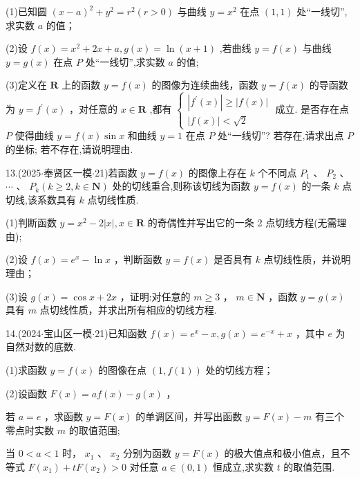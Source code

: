 (1)已知圆 ${\left( x - a\right) }^{2} + {y}^{2} = {r}^{2}\left( {r > 0}\right)$ 与曲线 $y = {x}^{2}$ 在点 $\left( {1,1}\right)$ 处“一线切”,求实数 $a$ 的值；

(2)设 $f\left( x\right)  = {x}^{2} + {2x} + a,g\left( x\right)  = \ln \left( {x + 1}\right)$ ,若曲线 $y = f\left( x\right)$ 与曲线 $y = g\left( x\right)$ 在点 $P$ 处“一线切”,求实数 $a$ 的值;

(3)定义在 $\mathbf{R}$ 上的函数 $y = f\left( x\right)$ 的图像为连续曲线，函数 $y = f\left( x\right)$ 的导函数为 $y = {f}^{\prime }\left( x\right)$ ，对任意的 $x \in  \mathbf{R}$ ,都有 $\left\{  \begin{array}{l} \left| {{f}^{\prime }\left( x\right) }\right|  \geq  \left| {f\left( x\right) }\right| \\  \left| {f\left( x\right) }\right|  < \sqrt{2} \end{array}\right.$ 成立. 是否存在点 $P$ 使得曲线 $y = f\left( x\right) \sin x$ 和曲线 $y = 1$ 在点 $P$ 处“一线切”? 若存在,请求出点 $P$ 的坐标; 若不存在,请说明理由.

13.(2025$\cdot$奉贤区一模$\cdot$21)若函数 $y = f\left( x\right)$ 的图像上存在 $k$ 个不同点 ${P}_{1}$ 、 ${P}_{2}$ 、 $\cdots$ 、 ${P}_{k}\left( {k \geq  2,k \in  \mathbf{N}}\right)$ 处的切线重合,则称该切线为函数 $y = f\left( x\right)$ 的一条 $k$ 点切线,该系数具有 $k$ 点切线性质.

(1)判断函数 $y = {x}^{2} - 2\left| x\right| ,x \in  \mathbf{R}$ 的奇偶性并写出它的一条 2 点切线方程(无需理由);

(2)设 $f\left( x\right)  = {{e}}^{x} - \ln x$ ，判断函数 $y = f\left( x\right)$ 是否具有 $k$ 点切线性质，并说明理由；

(3)设 $g\left( x\right)  = \cos x + {2x}$ ，证明:对任意的 $m \geq  3$ ， $m \in  \mathbf{N}$ ，函数 $y = g\left( x\right)$ 具有 $m$ 点切线性质，并求出所有相应的切线方程.

14.(2024$\cdot$宝山区一模$\cdot$21)已知函数 $f\left( x\right)  = {{e}}^{x} - x,g\left( x\right)  = {{e}}^{-x} + x$ ，其中 ${e}$ 为自然对数的底数.

(1)求函数 $y = f\left( x\right)$ 的图像在点 $\left( {1,f\left( 1\right) }\right)$ 处的切线方程；

(2)设函数 $F\left( x\right)  = {af}\left( x\right)  - g\left( x\right)$ ，

   若 $a = {e}$ ，求函数 $y = F\left( x\right)$ 的单调区间，并写出函数 $y = F\left( x\right)  - m$ 有三个零点时实数 $m$ 的取值范围;

   当 $0 < a < 1$ 时， ${x}_{1}$ 、 ${x}_{2}$ 分别为函数 $y = F\left( x\right)$ 的极大值点和极小值点，且不等式 $F\left( {x}_{1}\right)  +  {tF}\left( {x}_{2}\right)  > 0$ 对任意 $a \in  \left( {0,1}\right)$ 恒成立,求实数 $t$ 的取值范围.

